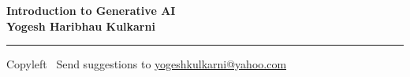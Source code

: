 
\graphicspath{{images/}}

\footnotesize


\begin{center}
\Large{\textbf{Introduction to Generative AI\\ Yogesh Haribhau Kulkarni}}  
\end{center}

\begin{multicols}{2}

\end{multicols}

\rule{\linewidth}{0.25pt}
\scriptsize
Copyleft \textcopyleft\  Send suggestions to 
\href{http://www.yogeshkulkarni.com}{yogeshkulkarni@yahoo.com}


